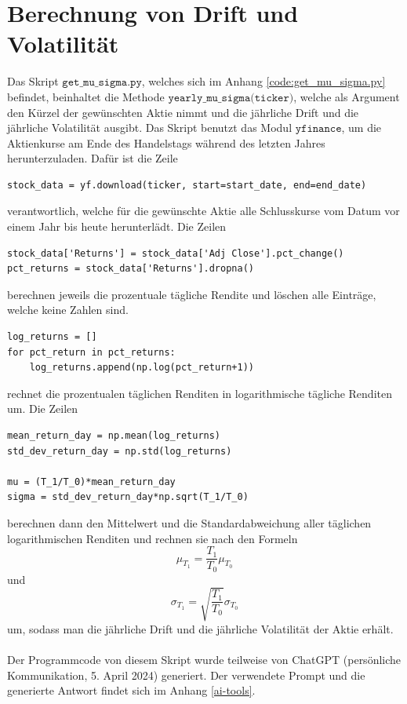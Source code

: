 \documentclass[11pt]{report} %
\begin{document}
\section{Berechnung von Drift und Volatilität}
Das Skript $\texttt{get\_mu\_sigma.py}$, welches sich im Anhang \ref{code:get_mu_sigma.py} befindet, beinhaltet die Methode $\texttt{yearly\_mu\_sigma(ticker)}$, welche als Argument den Kürzel der gewünschten Aktie nimmt und die jährliche Drift und die jährliche Volatilität ausgibt. Das Skript benutzt das Modul $\texttt{yfinance}$, um die Aktienkurse am Ende des Handelstags während des letzten Jahres herunterzuladen. Dafür ist die Zeile \begin{lstlisting}
stock_data = yf.download(ticker, start=start_date, end=end_date)
\end{lstlisting} verantwortlich, welche für die gewünschte Aktie alle Schlusskurse vom Datum vor einem Jahr bis heute herunterlädt. Die Zeilen \begin{lstlisting}
stock_data['Returns'] = stock_data['Adj Close'].pct_change()
pct_returns = stock_data['Returns'].dropna()
\end{lstlisting}
berechnen jeweils die prozentuale tägliche Rendite und löschen alle Einträge, welche keine Zahlen sind. \begin{lstlisting}
log_returns = []
for pct_return in pct_returns:
    log_returns.append(np.log(pct_return+1))
\end{lstlisting} rechnet die prozentualen täglichen Renditen in logarithmische tägliche Renditen um. Die Zeilen \begin{lstlisting}
mean_return_day = np.mean(log_returns)
std_dev_return_day = np.std(log_returns)

mu = (T_1/T_0)*mean_return_day
sigma = std_dev_return_day*np.sqrt(T_1/T_0)
\end{lstlisting} berechnen dann den Mittelwert und die Standardabweichung aller täglichen logarithmischen Renditen und rechnen sie nach den Formeln $$\mu_{T_1}=\frac{T_1}{T_0}\mu_{T_0}$$ und $$\sigma_{T_1}=\sqrt{\frac{T_1}{T_0}}\sigma_{T_0}$$ um, sodass man die jährliche Drift und die jährliche Volatilität der Aktie erhält.\\\\Der Programmcode von diesem Skript wurde teilweise von ChatGPT (persönliche Kommunikation, 5. April 2024) generiert. Der verwendete Prompt und die generierte Antwort findet sich im Anhang \ref{ai-tools}.
\end{document}
